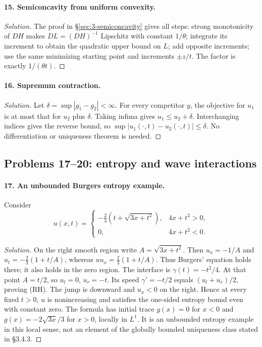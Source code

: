\Needspace{30mm}
\paragraph{15. Semiconcavity from uniform convexity.}
\begin{proof}[Solution]
The proof in \S\ref{sec:3-semiconcavity} gives all steps:
strong monotonicity of $DH$ makes $DL=(DH)^{-1}$ Lipschitz with
constant $1/\theta$; integrate its increment to obtain the quadratic
upper bound on $L$; add opposite increments; use the same minimizing
starting point and increments $\pm z/t$. The factor is exactly
$1/(\theta t)$.
\end{proof}

\Needspace{30mm}
\paragraph{16. Supremum contraction.}
\begin{proof}[Solution]
Let $\delta=\sup|g_1-g_2|<\infty$.
For every competitor $y$, the objective for $u_1$ is at most that for
$u_2$ plus $\delta$. Taking infima gives $u_1\leq u_2+\delta$.
Interchanging indices gives the reverse bound, so
$\sup|u_1(\cdot,t)-u_2(\cdot,t)|\leq\delta$.
No differentiation or uniqueness theorem is needed.
\end{proof}

\subsection{Problems 17--20: entropy and wave interactions}
\Needspace{30mm}
\paragraph{17. An unbounded Burgers entropy example.}
Consider
\[
 u(x,t)=\begin{cases}
 -\tfrac23(t+\sqrt{3x+t^2}),&4x+t^2>0,\\
 0,&4x+t^2<0.
 \end{cases}
\]
\begin{proof}[Solution]
On the right smooth region write $A=\sqrt{3x+t^2}$.
Then $u_x=-1/A$ and $u_t=-\tfrac23(1+t/A)$,
whereas $uu_x=\tfrac23(1+t/A)$.
Thus Burgers' equation holds there; it also holds in the zero region.
The interface is $\gamma(t)=-t^2/4$.
At that point $A=t/2$, so $u_l=0$, $u_r=-t$.
Its speed $\gamma'=-t/2$ equals $(u_l+u_r)/2$, proving (RH).
The jump is downward and $u_x<0$ on the right.
Hence at every fixed $t>0$, $u$ is nonincreasing and satisfies the
one-sided entropy bound even with constant zero.
The formula has initial trace
$g(x)=0$ for $x<0$ and $g(x)=-2\sqrt{3x}/3$ for $x>0$,
locally in $L^1$.
It is an unbounded entropy example in this local sense, not an element
of the globally bounded uniqueness class stated in \S3.4.3.
\end{proof}
\Needspace{45mm}


